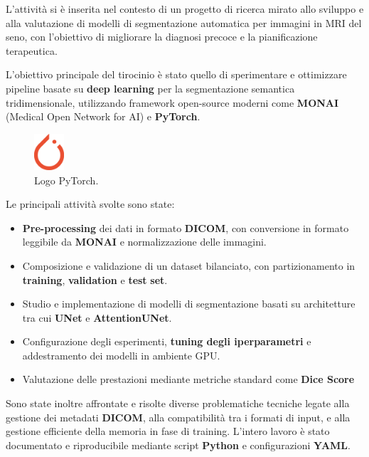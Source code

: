 L’attività si è inserita nel contesto di un progetto di ricerca mirato allo sviluppo e alla valutazione di modelli di segmentazione automatica per immagini in MRI del seno, con l’obiettivo di migliorare la diagnosi precoce e la pianificazione terapeutica.

L’obiettivo principale del tirocinio è stato quello di sperimentare e ottimizzare pipeline basate su \textbf{deep learning} per la segmentazione semantica tridimensionale, utilizzando framework open-source moderni come \textbf{MONAI} (Medical Open Network for AI) \cite{cardoso2022monai} e \textbf{PyTorch}.


\begin{figure} 
  	\centering 
 	\includegraphics[width=0.1\textwidth]{images/2025-08-08-20-13-58.png}  
	\caption{Logo PyTorch. \cite{pytorch_logo}}
 \end{figure} 


Le principali attività svolte sono state:
\begin{itemize}
    \item \textbf{Pre-processing} dei dati in formato \textbf{DICOM}, con conversione in formato leggibile da \textbf{MONAI} e normalizzazione delle immagini.
    \item Composizione e validazione di un dataset bilanciato, con partizionamento in \textbf{training}, \textbf{validation} e \textbf{test} \textbf{set}.
    \item Studio e implementazione di modelli di segmentazione basati su architetture tra cui \textbf{UNet} e \textbf{AttentionUNet}.
    \item Configurazione degli esperimenti, \textbf{tuning degli iperparametri} e addestramento dei modelli in ambiente GPU.
    \item Valutazione delle prestazioni mediante metriche standard come \textbf{Dice Score}
\end{itemize}

Sono state inoltre affrontate e risolte diverse problematiche tecniche legate alla gestione dei metadati \textbf{DICOM}, alla compatibilità tra i formati di input, e alla gestione efficiente della memoria in fase di training. L'intero lavoro è stato documentato e riproducibile mediante script \textbf{Python} e configurazioni \textbf{YAML}.


